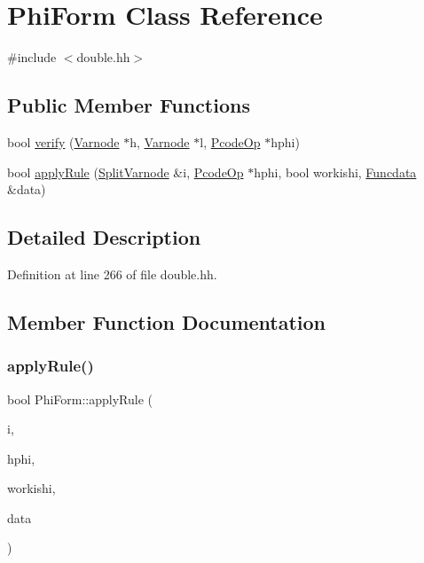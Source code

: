 \hypertarget{class_phi_form}{}\section{Phi\+Form Class Reference}
\label{class_phi_form}


{\ttfamily \#include $<$double.\+hh$>$}

\subsection*{Public Member Functions}
\begin{DoxyCompactItemize}
\item 
bool \mbox{\hyperlink{class_phi_form_ae7266e0446e1377f7547a6c81453fb4f}{verify}} (\mbox{\hyperlink{class_varnode}{Varnode}} $\ast$h, \mbox{\hyperlink{class_varnode}{Varnode}} $\ast$l, \mbox{\hyperlink{class_pcode_op}{Pcode\+Op}} $\ast$hphi)
\item 
bool \mbox{\hyperlink{class_phi_form_afc1412bb35a1236fd0318fb42b813113}{apply\+Rule}} (\mbox{\hyperlink{class_split_varnode}{Split\+Varnode}} \&i, \mbox{\hyperlink{class_pcode_op}{Pcode\+Op}} $\ast$hphi, bool workishi, \mbox{\hyperlink{class_funcdata}{Funcdata}} \&data)
\end{DoxyCompactItemize}


\subsection{Detailed Description}


Definition at line 266 of file double.\+hh.



\subsection{Member Function Documentation}
\mbox{\label{class_phi_form_afc1412bb35a1236fd0318fb42b813113}} 
\subsubsection{\texorpdfstring{applyRule()}{applyRule()}}
{\footnotesize\ttfamily bool Phi\+Form\+::apply\+Rule (\begin{DoxyParamCaption}\item[{\mbox{\hyperlink{class_split_varnode}{Split\+Varnode}} \&}]{i,  }\item[{\mbox{\hyperlink{class_pcode_op}{Pcode\+Op}} $\ast$}]{hphi,  }\item[{bool}]{workishi,  }\item[{\mbox{\hyperlink{class_funcdata}{Funcdata}} \&}]{data }\end{DoxyParamCaption})}



